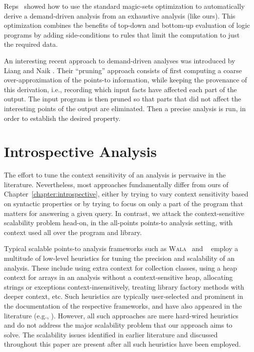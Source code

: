 Reps~\cite{cc:1994:Reps} showed how to use the standard magic-sets optimization to automatically derive a demand-driven analysis from an exhaustive analysis (like ours). This optimization combines the benefits of top-down and bottom-up evaluation of logic programs by adding side-conditions to rules that limit the computation to just the required data.

An interesting recent approach to demand-driven analyses was introduced by Liang and Naik \cite{pldi:2011:Liang}. Their ``pruning'' approach consists of first computing a coarse over-approximation of the points-to information, while keeping the provenance of this derivation, i.e., recording which input facts have affected each part of the output. The input program is then pruned so that parts that did not affect the interesting points of the output are eliminated. Then a precise analysis is run, in order to establish the desired property.



\section{Introspective Analysis}
\label{sec:related:introspective}

The effort to tune the context sensitivity of an analysis is pervasive in the literature. Nevertheless, most approaches fundamentally differ from ours of Chapter~\ref{chapter:introspective}, either by trying to vary context sensitivity based on syntactic properties or by trying to focus on only a part of the program that matters for answering a given query. In contrast, we attack the context-sensitive scalability problem  head-on, in the all-points points-to analysis setting, with context used all over the program and library.

Typical scalable points-to analysis frameworks such as \textsc{Wala}~\cite{www:wala} and \doop{}~\cite{oopsla:2009:Bravenboer} employ a multitude of low-level heuristics for tuning the precision and scalability of an analysis. These include using extra context for collection classes, using a heap context for arrays in an analysis without a context-sensitive heap, allocating strings or exceptions context-insensitively, treating library factory methods with deeper context, etc. Such heuristics are typically user-selected and prominent in the documentation of the respective frameworks, and have also appeared in the literature (e.g., \cite{pldi:2009:Tripp,cc:2013:Kastrinis}). However, all such approaches are mere hard-wired heuristics and do not address the major scalability problem that our approach aims to solve. The scalability issues identified in earlier literature and discussed throughout this paper are present after all such heuristics have been employed.

